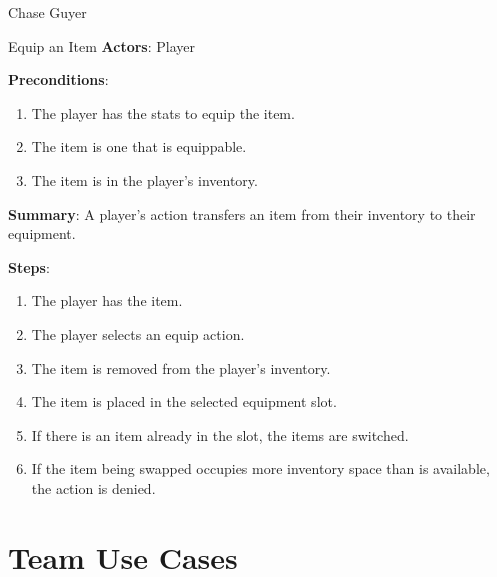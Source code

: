 \documentclass[12pt]{report}
\begin{document}
\begin{section}{Chase Guyer}
\begin{subsection}{Equip an Item}
\textbf{Actors}:
Player

\textbf{Preconditions}:
\begin{enumerate}
\item The player has the stats to equip the item.
\item The item is one that is equippable.
\item The item is in the player's inventory.
\end{enumerate}

\textbf{Summary}:
A player's action transfers an item from their inventory to their equipment.

\textbf{Steps}:
\begin{enumerate}
\item The player has the item.
\item The player selects an equip action.
\item The item is removed from the player's inventory.
\item The item is placed in the selected equipment slot.
\item If there is an item already in the slot, the items are switched.
\item If the item being swapped occupies more inventory space than is available,
the action is denied.
\end{enumerate}
\end{subsection}

\end{section}

\chapter{Team Use Cases}

\end{document}
